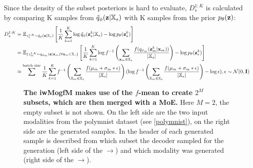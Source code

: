 Since the density of the subset posteriors is hard to evaluate, $D^{1:K}_s$ is calculated by comparing K samples from $\tilde{q}_{\phi}(\textbf{z}|\mathbb{X}_s)$ with K samples from the prior $p_{\theta}(\textbf{z})$:
\begin{equation}
    \begin{split}
        D^{1:K}_s &=  \mathbb{E}_{z^{1:K}_s \sim \tilde{q}_{\phi}(\textbf{z}|\mathbb{X}_s)} \left[ \frac{1}{K} \sum _{k=1}^K \log \tilde{q}_{\phi}(\textbf{z}^k _s|\mathbb{X}_s) - \log p_{\theta}(\textbf{z}^k _s) \right]\\
        &=     \mathbb{E}_{\{z^{1:K}_m \sim q_{\phi_m}(\textbf{z}|\textbf{x}_m) \forall \textbf{x}_m \in \mathbb{X}_s\}} \left[ \frac{1}{K} \sum _{k=1}^K \log f^{-1}\left(\sum _{\textbf{x}_m \in \mathbb{X}_s} \frac{f(q_{\phi_m}(\textbf{z}_m^k|\textbf{x}_m))}{|\mathbb{X}_s|}\right) - \log p_{\theta}(\textbf{z}^k _s) \right] \label{eq:samplestep}\\
        &\approx \sum ^{\text{batch size}} \frac{1}{K} \sum _{k=1}^K f^{-1}\left(\sum _{\mathbb{X}_m \in \mathbb{X}_s} \frac{f(\mu_m+\sigma_m\ast \epsilon)}{|\mathbb{X}_s|}\right)(  \log f^{-1}\left(\sum _{\mathbb{X}_m \in \mathbb{X}_s} \frac{f(\mu_m+\sigma_m\ast \epsilon)}{|\mathbb{X}_s|}\right) - \log \epsilon), \epsilon \sim \mathcal{N}(0,\textbf{I})
    \end{split}
\end{equation}

%



\begin{figure}[h!]
    \centering
    \caption{\textbf{The iwMogfM makes use of the $f$-mean to create $2^M$ subsets, which are then merged with a MoE.} Here $M=2$, the empty subset is not shown. On the left side are the two input modalities from the polymnist dataset (see \cref{polymnist}), on the right side are the generated samples. In the header of each generated sample is described from which subset the decoder sampled for the generation (left side of the $\rightarrow$) and which modality was generated (right side of the $\rightarrow$).}
    \label{iwmogfmGraph}
\end{figure}

